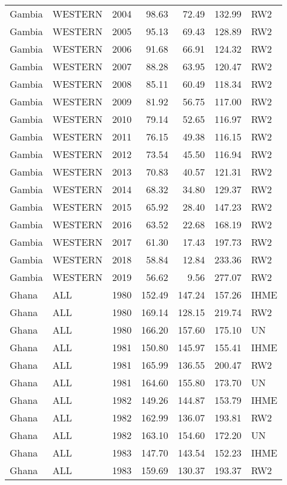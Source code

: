 \begin{longtable}{lllrrrl}
  Gambia & WESTERN & 2004 & 98.63 & 72.49 & 132.99 & RW2 \\ 
  Gambia & WESTERN & 2005 & 95.13 & 69.43 & 128.89 & RW2 \\ 
  Gambia & WESTERN & 2006 & 91.68 & 66.91 & 124.32 & RW2 \\ 
  Gambia & WESTERN & 2007 & 88.28 & 63.95 & 120.47 & RW2 \\ 
  Gambia & WESTERN & 2008 & 85.11 & 60.49 & 118.34 & RW2 \\ 
  Gambia & WESTERN & 2009 & 81.92 & 56.75 & 117.00 & RW2 \\ 
  Gambia & WESTERN & 2010 & 79.14 & 52.65 & 116.97 & RW2 \\ 
  Gambia & WESTERN & 2011 & 76.15 & 49.38 & 116.15 & RW2 \\ 
  Gambia & WESTERN & 2012 & 73.54 & 45.50 & 116.94 & RW2 \\ 
  Gambia & WESTERN & 2013 & 70.83 & 40.57 & 121.31 & RW2 \\ 
  Gambia & WESTERN & 2014 & 68.32 & 34.80 & 129.37 & RW2 \\ 
  Gambia & WESTERN & 2015 & 65.92 & 28.40 & 147.23 & RW2 \\ 
  Gambia & WESTERN & 2016 & 63.52 & 22.68 & 168.19 & RW2 \\ 
  Gambia & WESTERN & 2017 & 61.30 & 17.43 & 197.73 & RW2 \\ 
  Gambia & WESTERN & 2018 & 58.84 & 12.84 & 233.36 & RW2 \\ 
  Gambia & WESTERN & 2019 & 56.62 & 9.56 & 277.07 & RW2 \\ 
  Ghana & ALL & 1980 & 152.49 & 147.24 & 157.26 & IHME \\ 
  Ghana & ALL & 1980 & 169.14 & 128.15 & 219.74 & RW2 \\ 
  Ghana & ALL & 1980 & 166.20 & 157.60 & 175.10 & UN \\ 
  Ghana & ALL & 1981 & 150.80 & 145.97 & 155.41 & IHME \\ 
  Ghana & ALL & 1981 & 165.99 & 136.55 & 200.47 & RW2 \\ 
  Ghana & ALL & 1981 & 164.60 & 155.80 & 173.70 & UN \\ 
  Ghana & ALL & 1982 & 149.26 & 144.87 & 153.79 & IHME \\ 
  Ghana & ALL & 1982 & 162.99 & 136.07 & 193.81 & RW2 \\ 
  Ghana & ALL & 1982 & 163.10 & 154.60 & 172.20 & UN \\ 
  Ghana & ALL & 1983 & 147.70 & 143.54 & 152.23 & IHME \\ 
  Ghana & ALL & 1983 & 159.69 & 130.37 & 193.37 & RW2 \\ 

\end{longtable}
